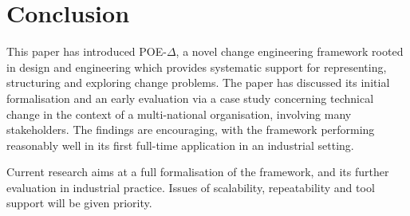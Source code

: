 \documentclass[runningheads,a4paper]{llncs}
\begin{document}
\section{Conclusion}\label{sect:Conclusion}
This paper has introduced POE-$\Delta$, a novel change engineering framework rooted in design and engineering which provides systematic support for representing, structuring and exploring change problems. The paper has discussed its initial formalisation and an early evaluation via a case study concerning technical change in the context of a multi-national organisation, involving many stakeholders. The findings are encouraging, with the framework performing reasonably well in its first full-time application in an industrial setting. 

Current research aims at a full formalisation of the framework, and its further evaluation in industrial practice. Issues of scalability, repeatability and tool support will be given priority.


\frenchspacing


\end{document}
